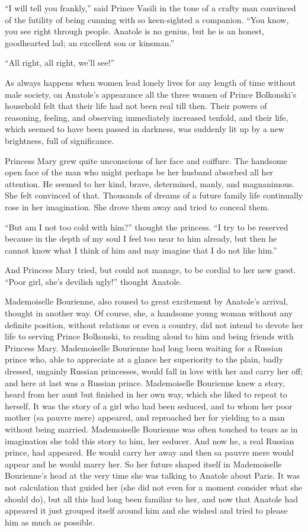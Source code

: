 ``I will tell you frankly,'' said Prince Vasili in the tone of a
crafty man convinced of the futility of being cunning with so
keen-sighted a companion. ``You know, you see right through
people. Anatole is no genius, but he is an honest, goodhearted
lad; an excellent son or kinsman.''

``All right, all right, we'll see!''

As always happens when women lead lonely lives for any length of
time without male society, on Anatole's appearance all the three
women of Prince Bolkonski's household felt that their life had
not been real till then. Their powers of reasoning, feeling, and
observing immediately increased tenfold, and their life, which
seemed to have been passed in darkness, was suddenly lit up by a
new brightness, full of significance.

Princess Mary grew quite unconscious of her face and
coiffure. The handsome open face of the man who might perhaps be
her husband absorbed all her attention. He seemed to her kind,
brave, determined, manly, and magnanimous. She felt convinced of
that. Thousands of dreams of a future family life continually
rose in her imagination. She drove them away and tried to conceal
them.

``But am I not too cold with him?'' thought the princess. ``I try
to be reserved because in the depth of my soul I feel too near to
him already, but then he cannot know what I think of him and may
imagine that I do not like him.''

And Princess Mary tried, but could not manage, to be cordial to
her new guest. ``Poor girl, she's devilish ugly!'' thought
Anatole.

Mademoiselle Bourienne, also roused to great excitement by
Anatole's arrival, thought in another way. Of course, she, a
handsome young woman without any definite position, without
relations or even a country, did not intend to devote her life to
serving Prince Bolkonski, to reading aloud to him and being
friends with Princess Mary. Mademoiselle Bourienne had long been
waiting for a Russian prince who, able to appreciate at a glance
her superiority to the plain, badly dressed, ungainly Russian
princesses, would fall in love with her and carry her off; and
here at last was a Russian prince. Mademoiselle Bourienne knew a
story, heard from her aunt but finished in her own way, which she
liked to repeat to herself. It was the story of a girl who had
been seduced, and to whom her poor mother (sa pauvre mere)
appeared, and reproached her for yielding to a man without being
married. Mademoiselle Bourienne was often touched to tears as in
imagination she told this story to him, her seducer. And now he,
a real Russian prince, had appeared. He would carry her away and
then sa pauvre mere would appear and he would marry her. So her
future shaped itself in Mademoiselle Bourienne's head at the very
time she was talking to Anatole about Paris. It was not
calculation that guided her (she did not even for a moment
consider what she should do), but all this had long been familiar
to her, and now that Anatole had appeared it just grouped itself
around him and she wished and tried to please him as much as
possible.

